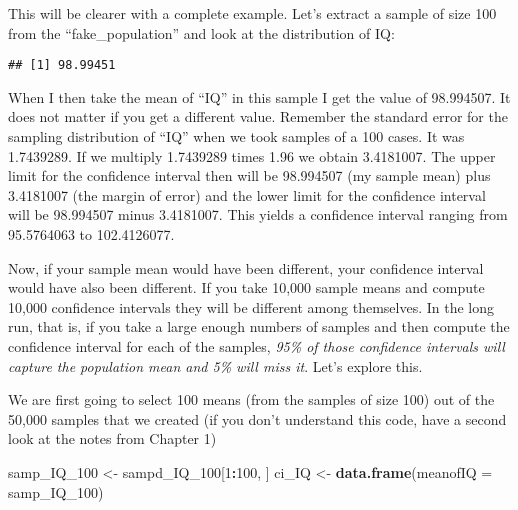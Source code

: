 \documentclass[
]{book}
\newenvironment{Shaded}{\begin{snugshade}}{\end{snugshade}}
\newcommand{\AttributeTok}[1]{\textcolor[rgb]{0.13,0.29,0.53}{#1}}
\newcommand{\DecValTok}[1]{\textcolor[rgb]{0.00,0.00,0.81}{#1}}
\newcommand{\FunctionTok}[1]{\textcolor[rgb]{0.13,0.29,0.53}{\textbf{#1}}}
\newcommand{\NormalTok}[1]{#1}
\newcommand{\OtherTok}[1]{\textcolor[rgb]{0.56,0.35,0.01}{#1}}
\newcommand{\SpecialCharTok}[1]{\textcolor[rgb]{0.81,0.36,0.00}{\textbf{#1}}}
\begin{document}
This will be clearer with a complete example. Let's extract a sample of size 100 from the ``fake\_population'' and look at the distribution of IQ:

\begin{Shaded}
\end{Shaded}

\begin{verbatim}
## [1] 98.99451
\end{verbatim}

When I then take the mean of ``IQ'' in this sample I get the value of 98.994507. It does not matter if you get a different value. Remember the standard error for the sampling distribution of ``IQ'' when we took samples of a 100 cases. It was 1.7439289. If we multiply 1.7439289 times 1.96 we obtain 3.4181007. The upper limit for the confidence interval then will be 98.994507 (my sample mean) plus 3.4181007 (the margin of error) and the lower limit for the confidence interval will be 98.994507 minus 3.4181007. This yields a confidence interval ranging from 95.5764063 to 102.4126077.

Now, if your sample mean would have been different, your confidence interval would have also been different. If you take 10,000 sample means and compute 10,000 confidence intervals they will be different among themselves. In the long run, that is, if you take a large enough numbers of samples and then compute the confidence interval for each of the samples, \emph{95\% of those confidence intervals will capture the population mean and 5\% will miss it}. Let's explore this.

We are first going to select 100 means (from the samples of size 100) out of the 50,000 samples that we created (if you don't understand this code, have a second look at the notes from Chapter 1)

\begin{Shaded}
\begin{Highlighting}[]
\NormalTok{samp\_IQ\_100 }\OtherTok{\textless{}{-}}\NormalTok{ sampd\_IQ\_100[}\DecValTok{1}\SpecialCharTok{:}\DecValTok{100}\NormalTok{, ]}
\NormalTok{ci\_IQ }\OtherTok{\textless{}{-}} \FunctionTok{data.frame}\NormalTok{(}\AttributeTok{meanofIQ =}\NormalTok{ samp\_IQ\_100)}
\end{Highlighting}
\end{Shaded}
\end{document}
